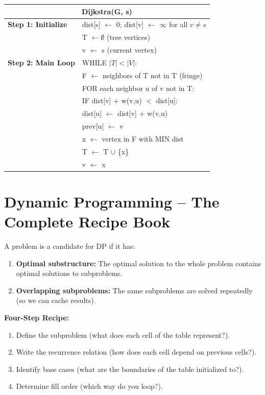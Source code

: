 \documentclass[12pt,portrait]{article}
\begin{document}
\begin{center}
\begin{tabular}{p{6cm}|p{6cm}}
\toprule
\multicolumn{2}{c}{\textbf{Dijkstra(G, s)}} \\
\midrule
\textbf{Step 1: Initialize} & dist[s] $\gets$ 0; dist[v] $\gets$ $\infty$ for all $v \neq s$ \\
& T $\gets \emptyset$ (tree vertices) \\
& v $\gets$ s (current vertex) \\
\midrule
\textbf{Step 2: Main Loop} & WHILE $|T| < |V|$: \\
& \quad F $\gets$ neighbors of T not in T (fringe) \\
& \quad FOR each neighbor u of v not in T: \\
& \quad\quad IF dist[v] + w(v,u) $<$ dist[u]: \\
& \quad\quad\quad dist[u] $\gets$ dist[v] + w(v,u) \\
& \quad\quad\quad prev[u] $\gets$ v \\
& \quad x $\gets$ vertex in F with MIN dist \\
& \quad T $\gets$ T $\cup$ \{x\} \\
& \quad v $\gets$ x \\
\bottomrule
\end{tabular}
\end{center}

\section{Dynamic Programming -- The Complete Recipe Book}
\label{sec:dp}

\begin{rulebox}
A problem is a candidate for DP if it has:
\begin{enumerate}[leftmargin=*]
    \item \textbf{Optimal substructure:} The optimal solution to the whole problem contains optimal solutions to subproblems.
    \item \textbf{Overlapping subproblems:} The same subproblems are solved repeatedly (so we can cache results).
\end{enumerate}

\textbf{Four-Step Recipe:}
\begin{enumerate}[leftmargin=*]
    \item Define the subproblem (what does each cell of the table represent?).
    \item Write the recurrence relation (how does each cell depend on previous cells?).
    \item Identify base cases (what are the boundaries of the table initialized to?).
    \item Determine fill order (which way do you loop?).
\end{enumerate}
\end{rulebox}
\end{document}
